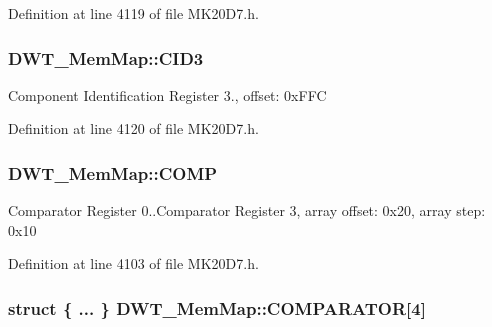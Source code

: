 Definition at line 4119 of file M\+K20\+D7.\+h.

\subsubsection[{\texorpdfstring{C\+I\+D3}{CID3}}]{ D\+W\+T\+\_\+\+Mem\+Map\+::\+C\+I\+D3}\hypertarget{struct_d_w_t___mem_map_af719ff30fb65a86a545f97f5b556e0b9}{}\label{struct_d_w_t___mem_map_af719ff30fb65a86a545f97f5b556e0b9}
Component Identification Register 3., offset\+: 0x\+F\+FC 

Definition at line 4120 of file M\+K20\+D7.\+h.

\subsubsection[{\texorpdfstring{C\+O\+MP}{COMP}}]{ D\+W\+T\+\_\+\+Mem\+Map\+::\+C\+O\+MP}\hypertarget{struct_d_w_t___mem_map_ae10b19c1d610d27a71a1dc34a84a0e60}{}\label{struct_d_w_t___mem_map_ae10b19c1d610d27a71a1dc34a84a0e60}
Comparator Register 0..Comparator Register 3, array offset\+: 0x20, array step\+: 0x10 

Definition at line 4103 of file M\+K20\+D7.\+h.

\subsubsection[{\texorpdfstring{C\+O\+M\+P\+A\+R\+A\+T\+OR}{COMPARATOR}}]{\setlength{\rightskip}{0pt plus 5cm}struct \{ ... \}   D\+W\+T\+\_\+\+Mem\+Map\+::\+C\+O\+M\+P\+A\+R\+A\+T\+OR\mbox{[}4\mbox{]}}\hypertarget{struct_d_w_t___mem_map_a2f14deafe6812b314d89628af98106cf}{}\label{struct_d_w_t___mem_map_a2f14deafe6812b314d89628af98106cf}
